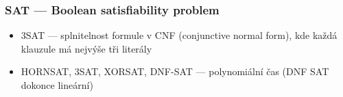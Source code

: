 \documentclass[red,professionalfont]{beamer}
\theoremstyle{definition}
\newcommand{\0}{\mbox{${\bf 0}$}}
\begin{document}
\begin{frame}\frametitle{SAT --- Boolean satisfiability problem}
\begin{itemize}
 \item 3SAT --- splnitelnost formule v CNF (conjunctive normal form), kde každá klauzule má nejvýše
       tři literály\pause
 \item HORNSAT, 3SAT, XORSAT, DNF-SAT --- polynomiální čas (DNF SAT dokonce lineární)\pause
\end{itemize}


\end{frame}
\end{document}
